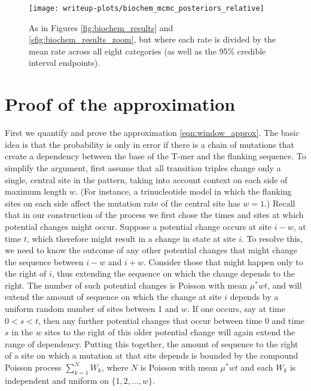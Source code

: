 \documentclass{article}
\theoremstyle{plain}
\theoremstyle{definition}
\begin{document}
\begin{figure}
    \begin{center}
        \texttt{[image: writeup-plots/biochem\_mcmc\_posteriors\_relative]}
    \end{center}
    \caption{
        As in Figures \ref{fig:biochem_results} and \ref{sfig:biochem_results_zoom},
        but where each rate is divided by the mean rate across all eight categories
        (as well as the 95\% credible interval endpoints).
        \label{sfig:biochem_results_relative}}
\end{figure}


\section{Proof of the approximation}
\label{ss:approx_pf}

First we quantify and prove the approximation \eqref{eqn:window_approx}.
The basic idea is that the probability is only in error if there is a chain of mutations
that create a dependency between the base of the T-mer and the flanking sequence.
To simplify the argument, first assume that all transition triples
change only a single, central site in the pattern,
taking into account context on each side of maximum length $w$.
(For instance, a trinucleotide model in which the flanking sites on each side
affect the mutation rate of the central site has $w=1$.)
Recall that in our construction of the process we first chose the times and sites
at which potential changes might occur.
Suppose a potential change occurs at site $i-w$, at time $t$,
which therefore might result in a change in state at site $i$.
To resolve this, we need to know the outcome of any other potential changes
that might change the sequence between $i-w$ and $i + w$.
Consider those that might happen only to the right of $i$,
thus extending the sequence on which the change depends to the right.
The number of such potential changes is Poisson with mean $\mu^* w t$,
and will extend the amount of sequence on which the change at site $i$ depends
by a uniform random number of sites between 1 and $w$.
If one occurs, say at time $0 < s < t$,
then any further potential changes that occur between time 0 and time $s$
in the $w$ sites to the right of this older potential change
will again extend the range of dependency.
Putting this together, the amount of sequence to the right of a site
on which a mutation at that site depends
is bounded by the compound Poisson process $\sum_{k=1}^N W_k$,
where $N$ is Poisson with mean $\mu^* w t$
and each $W_k$ is independent and uniform on $\{1, 2, \ldots, w\}$.
\end{document}
